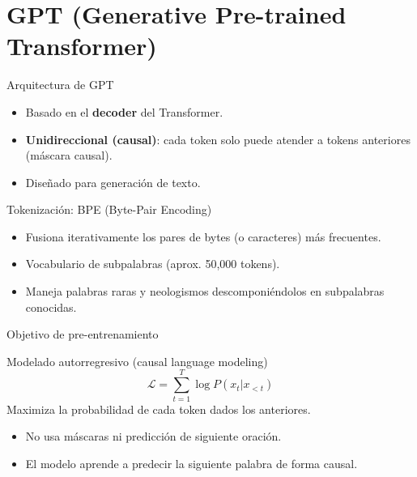 \documentclass[aspectratio=169, 10pt, xcolor=table]{beamer}
\begin{document}
\section{GPT (Generative Pre-trained Transformer)}

\begin{frame}{Arquitectura de GPT}
    \begin{itemize}
        \item Basado en el \textbf{decoder} del Transformer.
        \item \textbf{Unidireccional (causal)}: cada token solo puede atender a tokens anteriores (máscara causal).
        \item Diseñado para generación de texto.
    \end{itemize}
\end{frame}

\begin{frame}{Tokenización: BPE (Byte-Pair Encoding)}
    \begin{itemize}
        \item Fusiona iterativamente los pares de bytes (o caracteres) más frecuentes.
        \item Vocabulario de subpalabras (aprox. 50,000 tokens).
        \item Maneja palabras raras y neologismos descomponiéndolos en subpalabras conocidas.
    \end{itemize}
\end{frame}

\begin{frame}{Objetivo de pre-entrenamiento}
    \begin{block}{Modelado autorregresivo (causal language modeling)}
        \[
        \mathcal{L} = \sum_{t=1}^{T} \log P(x_t | x_{<t})
        \]
        Maximiza la probabilidad de cada token dados los anteriores.
    \end{block}
    \begin{itemize}
        \item No usa máscaras ni predicción de siguiente oración.
        \item El modelo aprende a predecir la siguiente palabra de forma causal.
    \end{itemize}
\end{frame}
\end{document}
